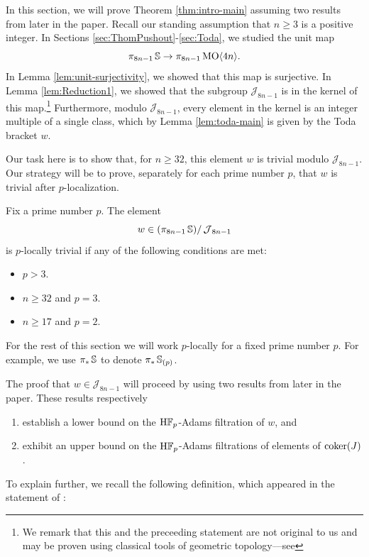 In this section, we will prove Theorem \ref{thm:intro-main} assuming two results from later in the paper.
Recall our standing assumption that $n \ge 3$ is a positive integer.  In Sections \ref{sec:ThomPushout}-\ref{sec:Toda}, we studied the unit map
$$\pi_{8n-1} \operatorname{\mathbb{S}} \to \pi_{8n-1} \operatorname{\mathrm{MO}} \langle 4n \rangle.$$
In Lemma \ref{lem:unit-surjectivity}, we showed that this map is surjective.  In Lemma \ref{lem:Reduction1}, we showed that the subgroup $\mathcal{J}_{8n-1}$ is in the kernel of this map.\footnote{We remark that this and the preceeding statement are not original to us and may be proven using classical tools of geometric topology---see } Furthermore, modulo $\mathcal{J}_{8n-1}$, every element in the kernel is an integer multiple of a single class, which by Lemma \ref{lem:toda-main} is given by the Toda bracket $w$.

Our task here is to show that, for $n \geq 32$, this element $w$ is trivial modulo $\mathcal{J}_{8n-1}$. Our strategy will be to prove, separately for each prime number $p$, that $w$ is trivial after $p$-localization. 

\begin{thm} \label{thm:w=0}
  Fix a prime number $p$.  The element
  $$w \in (\pi_{8n-1} \operatorname{\mathbb{S}}) / \operatorname{\mathcal{J}}_{8n-1}$$
  is $p$-locally trivial if any of the following conditions are met:
  \begin{itemize}
  \item $p > 3$.
  \item $n \geq 32$ and $p=3$.
  \item $n \geq 17$ and $p=2$.
  \end{itemize}
\end{thm}

\begin{cnv}
For the rest of this section we will work $p$-locally for a fixed prime number $p$.  For example, we use $\pi_*\operatorname{\mathbb{S}}$ to denote $\pi_*\operatorname{\mathbb{S}}_{(p)}$.
\end{cnv}

The proof that $w \in \mathcal{J}_{8n-1}$ will proceed by using two results from later in the paper.   These results respectively
\begin{enumerate}
    \item establish a lower bound on the $\mathrm{H}\mathbb{F}_p$-Adams filtration of $w$, and
    \item exhibit an upper bound on the $\mathrm{H}\mathbb{F}_p$-Adams filtrations of elements of $\operatorname{\mathrm{coker}} (J)$.
\end{enumerate}
To explain further, we recall the following definition, which appeared in the statement of :

